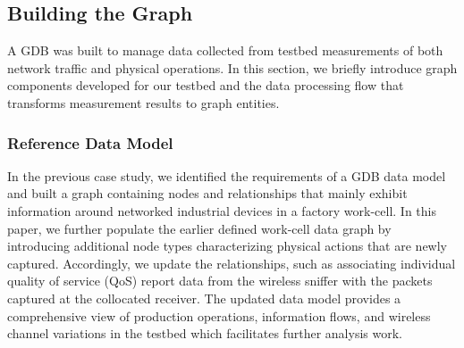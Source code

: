 \subsection{Building the Graph} \label{gdbappl:sec:graph}

A GDB was built to manage data collected from testbed measurements of both network traffic and physical operations.
In this section, we briefly introduce graph components developed for our testbed and the data processing flow that transforms measurement results to graph entities. 

\subsubsection{Reference Data Model}
In the previous case study, we identified the requirements of a GDB data model and built a graph containing nodes and relationships that mainly exhibit information around networked industrial devices in a factory work-cell. In this paper, we further populate the earlier defined work-cell data graph by introducing additional node types characterizing physical actions that are newly captured. Accordingly, we update the relationships, such as associating individual quality of service (QoS) report data from the wireless sniffer with the packets captured at the collocated receiver. The updated data model provides a comprehensive view of production operations, information flows, and wireless channel variations in the testbed which facilitates further analysis work.  

